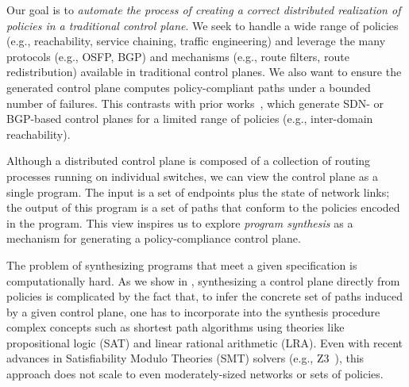 Our goal is to {\em automate the process of creating a correct distributed
realization of policies in a traditional control plane}. We seek to handle
a wide range of policies (e.g., reachability, service chaining, traffic
engineering) and leverage the many protocols (e.g., OSFP, BGP) and mechanisms
(e.g., route filters, route redistribution) available in traditional control
planes. We also want to ensure the generated control plane computes
policy-compliant paths under a bounded number of failures. This contrasts with
prior works~\cite{netegg, propane}, which generate SDN- or BGP-based
control planes for a limited range of policies (e.g., inter-domain
reachability).

Although a distributed control plane is composed of a collection of routing
processes running on individual switches, we can view the control plane as a
single program. The input is a set of endpoints plus the state of network
links; the output of this program is a set of paths that conform to the
policies encoded in the program. This view inspires us to explore {\em program
synthesis} as a mechanism for generating a policy-compliance control plane.



The problem of synthesizing programs that meet a given specification
is computationally hard. 
As we show in , synthesizing a control plane
directly from policies is complicated by the fact that, to infer the concrete
set of paths induced by a given control plane, one has to incorporate
into the synthesis procedure complex concepts such as shortest path algorithms
using theories like propositional logic (SAT) and linear rational
arithmetic (LRA). Even with recent advances in Satisfiability Modulo Theories
(SMT) solvers (e.g., Z3~\cite{z3}), this approach does not scale to
even moderately-sized networks or sets of policies.

